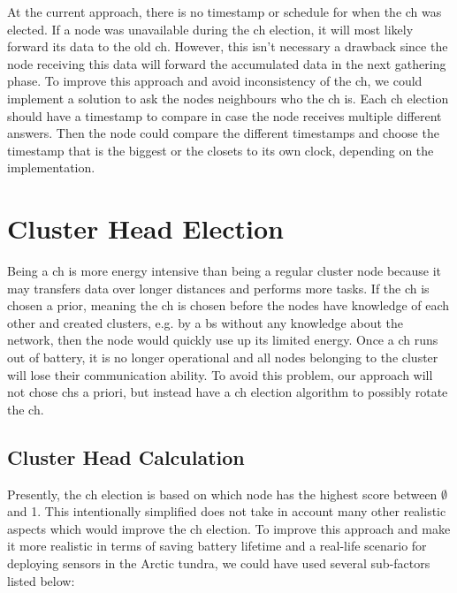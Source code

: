 \documentclass[USenglish]{uit-thesis}
\begin{document}
At the current approach, there is no timestamp or schedule for when the \gls{ch} was elected. If a node was unavailable during the \gls{ch} election, it will most likely forward its data to the old \gls{ch}. However, this isn't necessary a drawback since the node receiving this data will forward the accumulated data in the next gathering phase.
To improve this approach and avoid inconsistency of the \gls{ch}, we could implement a solution to ask the nodes neighbours who the \gls{ch} is. Each \gls{ch} election should have a timestamp to compare in case the node receives multiple different answers. Then the node could compare the different timestamps and choose the timestamp that is the biggest or the closets to its own clock, depending on the implementation. 



\section{Cluster Head Election} \label{disc:ch_election}
Being a \gls{ch} is more energy intensive than being a regular cluster node because it may transfers data over longer distances and performs more tasks. If the \gls{ch} is chosen a prior, meaning the \gls{ch} is chosen before the nodes have knowledge of each other and created clusters, e.g. by a \gls{bs} without any knowledge about the network, then the node would quickly use up its limited energy. Once a \gls{ch} runs out of battery, it is no longer operational and all nodes belonging to the cluster will lose their communication ability. To avoid this problem, our approach will not chose \gls{ch}s a priori, but instead have a \gls{ch} election algorithm to possibly rotate the \gls{ch}.




\subsection{Cluster Head Calculation} \label{ssec:ch_election}
Presently, the \gls{ch} election is based on which node has the highest score between $\emptyset$ and 1. This intentionally simplified does not take in account many other realistic aspects which would improve the \gls{ch} election. To improve this approach and make it more realistic in terms of saving battery lifetime and a real-life scenario for deploying sensors in the Arctic tundra, we could have used several sub-factors listed below:
\end{document}
